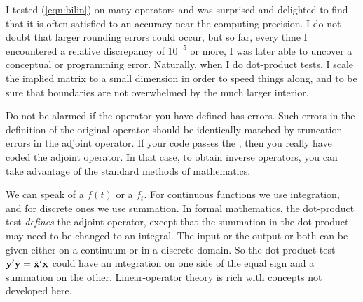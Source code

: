 
\par
I tested (\ref{eqn:bilin}) on many operators
and was surprised and delighted to find
that it is often satisfied to an accuracy near the computing precision.
I do not doubt that larger rounding errors could occur,
but so far,
every time I encountered a relative discrepancy of $10^{-5}$ or more,
I was later able to uncover a conceptual or programming error.
Naturally,
when I do dot-product tests, I scale the implied matrix to a
small dimension in order
to speed things along, and to be sure that
boundaries are not overwhelmed by the much larger interior.

\par
Do not be alarmed if the operator you have defined has  errors.
Such errors in the definition of the original operator
should be identically matched by
truncation errors in the adjoint operator.
If your code passes the ,
then you really have coded the adjoint operator.
In that case,
to obtain inverse operators,
you can take advantage of the standard methods of mathematics.

\par
We can speak of a  $f(t)$
or a  $f_t$.
For continuous functions we use integration,
and for discrete ones we use summation.
In formal mathematics, the dot-product test 
{\em  defines} the adjoint operator,
except that the summation in the dot product
may need to be changed to an integral.
The input or the output or both can be given
either on a continuum or in a discrete domain.
So the dot-product test
$\bold y' \tilde{\bold y} = \tilde{\bold x}' \bold x$
could have an integration on one side of the equal sign
and a summation on the other.
Linear-operator theory is rich with concepts not developed here.

